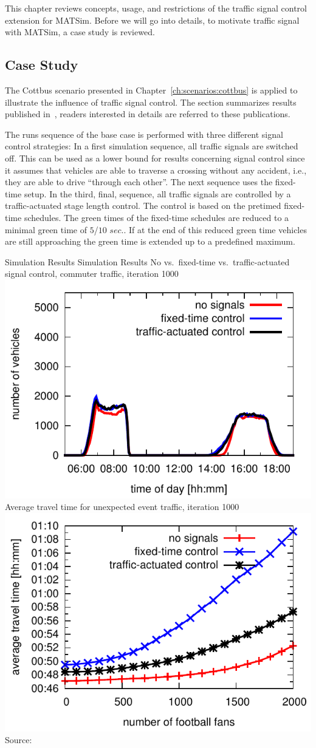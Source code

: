 This chapter reviews concepts, usage, and restrictions of the traffic signal control extension for MATSim. 
Before we will go into details, to motivate traffic signal with MATSim, a case study is reviewed. 

\subsection{Case Study}

The Cottbus scenario presented in Chapter~\ref{ch:scenarios:cottbus} is applied to illustrate the influence of traffic signal control. 
The section summarizes results published in~\citet{GretherBischoffNagel2011CottbusSylviaEventAbstract,Grether2014PhD}, readers interested in details are referred to these publications. 

%
The runs sequence of the base case is performed with three different signal control strategies:
%
In a first simulation sequence, all traffic signals are switched off. This can be used as a lower bound for results concerning signal control since it assumes that vehicles are able to traverse a crossing without any accident, i.e., they are able to drive ``through each other''. 
%
The next sequence uses the fixed-time setup. 
%
In the third, final, sequence, all traffic signals are controlled by a traffic-actuated stage length control. 
The control is based on the pretimed fixed-time schedules. 
The green times of the fixed-time schedules are reduced to a minimal green time of $5$/$10$ $sec.$. 
If at the end of this reduced green time vehicles are still approaching the green time is extended up to a predefined maximum. 

\createfigure%
{Simulation Results}%
{Simulation Results}%
{\label{fig:results_histogram}}
{%
  \createsubfigure%
  {No vs.~fixed-time vs.~traffic-actuated signal control, commuter traffic, iteration 1000}%
	{\includegraphics[width=0.48\linewidth]{extending/figures/signalslanes/leg_histogram_1292_1293_1291_it_1000.pdf}}
  {\label{fig:commuter_traffic}}%
  \createsubfigure%
	{Average travel time for unexpected event traffic, iteration 1000}
	{\includegraphics[width=0.48\linewidth]{extending/figures/signalslanes/average_travel_time_1220_1222.pdf}}
	{\label{fig:unexpected_event}}
}%
{Source:~\citet{Grether2014PhD}}

